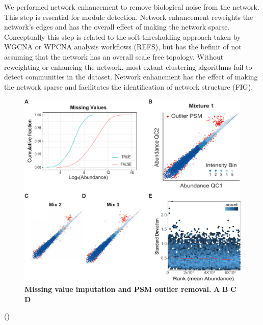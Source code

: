 \documentclass[12pt]{elife}\usepackage[]{graphicx}\usepackage[]{color}
\begin{document}
We performed network enhancement to remove biological noise from the network.
This step is essential for module detection. Network enhancement reweights the
network's edges and has the overall effect of making the network sparse.
Conceptually this step is related to the soft-thresholding approach taken by 
WGCNA or WPCNA analysis workflows (REFS), but has the befinit of not assuming
that the network has an overall scale free topology. 
Without reweighting or enhancing the network, most extant clustering 
algorithms fail to detect communities in the dataset. 
Network enhancment has the effect of making the
network sparse and facilitates the identification of network structure (FIG).\\

\begin{figure}[h] %
  \begin{fullwidth}
  \begin{center}
	  \includegraphics[width=0.9\paperwidth,keepaspectratio]{impute}
	  \caption{\textbf{Missing value imputation and PSM outlier removal.}
	  \textbf{A} \textbf{B} \textbf{C} \textbf{D} }
	  \label{fig:impute}
  \end{center}
  \end{fullwidth}
\end{figure}


()
\end{document}
